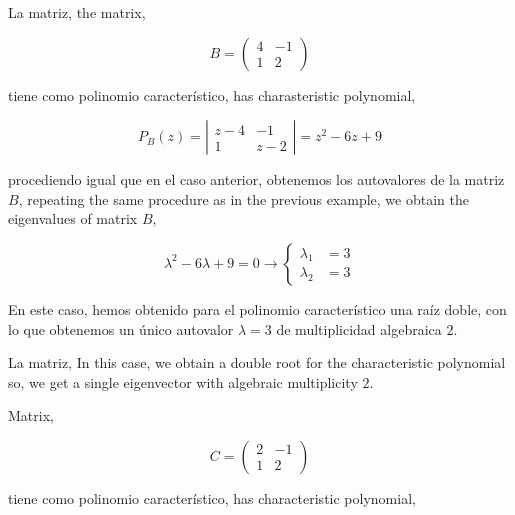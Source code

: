 \begin{paracol}{2}
La matriz,
\switchcolumn
the matrix,
\end{paracol}
\begin{equation*}
B=\begin{pmatrix}
4& -1\\
1& 2
\end{pmatrix}
\end{equation*}
\begin{paracol}{2}
tiene como polinomio característico,
\switchcolumn
has charasteristic polynomial, 
\end{paracol}
\begin{equation*}
P_B(z)=\left\vert\begin{matrix}
z-4& -1\\
1& z-2 
\end{matrix} \right\vert=z^2-6z+9
\end{equation*}
\begin{paracol}{2}
procediendo igual que en el caso anterior, obtenemos los autovalores de la matriz $B$,
\switchcolumn
repeating the same procedure as in the previous example, we obtain the eigenvalues of matrix $B$,
\end{paracol}
\begin{equation*}
\lambda^2-6\lambda+9=0 \rightarrow \left\{ 
\begin{aligned}
\lambda_1&=3\\
\lambda_2&=3
\end{aligned}
\right.
\end{equation*}
\begin{paracol}{2}
En este caso, hemos obtenido para el polinomio característico una raíz doble, con lo que obtenemos un único autovalor $\lambda=3$ de multiplicidad algebraica $2$.

La matriz,
\switchcolumn
In this case, we obtain a double root for the characteristic polynomial so, we get a single eigenvector with algebraic multiplicity $2$. 

Matrix,
\end{paracol}
\begin{equation*}
C=\begin{pmatrix}
2& -1\\
1& 2
\end{pmatrix}
\end{equation*}
\begin{paracol}{2}
tiene como polinomio característico,
\switchcolumn
has characteristic polynomial,
\end{paracol}
